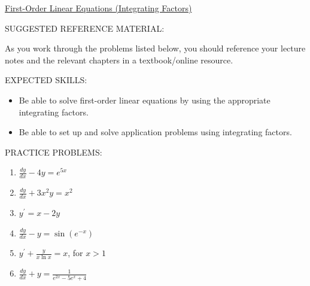 \documentclass[12pt]{article}
\newif\ifans
\begin{document}
\begin{center}
\underline{\LARGE{First-Order Linear Equations (Integrating Factors)}}
\end{center}

\noindent SUGGESTED REFERENCE MATERIAL:

\medskip

\noindent As you work through the problems listed below, you should reference your lecture 
notes and the relevant chapters in a textbook/online resource.

\bigskip

\noindent EXPECTED SKILLS:

\medskip

\begin{itemize}[topsep=0pt]

\item Be able to solve first-order linear equations by using the appropriate integrating factors.

\item Be able to set up and solve application problems using integrating factors. 

\end{itemize}

\bigskip

\noindent PRACTICE PROBLEMS:

\medskip


\medskip

\begin{enumerate}
\setcounter{enumi}{0}

\item $\frac{dy}{dx}-4y=e^{5x}$

\ifans{\fbox{$y=e^{5x}+Ce^{4x}$}} \fi

\item $\frac{dy}{dx}+3x^2y=x^2$

\ifans{\fbox{$\frac{1}{3}+Ce^{-x^3}$}} \fi

\item $y^{\prime}=x-2y$

\ifans{\fbox{$Ce^{-2x}+\frac{1}{2}x-\frac{1}{4}$}} \fi

\item $\frac{dy}{dx}-y=\sin{(e^{-x})}$

\ifans{\fbox{$y=e^x\cos{(e^{-x})}+Ce^x$}} \fi

\item $y^{\prime}+\frac{y}{x\ln{x}}=x$, for $x>1$

\ifans{\fbox{$y=\frac{1}{2}x^2-\frac{x^2}{4\ln{x}}+\frac{C}{\ln{x}}$}} \fi

\item $\frac{dy}{dx}+y=\frac{1}{e^{2x}-5e^x+4}$

\ifans{\fbox{$y=\frac{1}{3}e^{-x}\ln{\left|\frac{e^x-4}{e^x-1}\right|+Ce^{-x}}$; Detailed Solution: \textcolor{blue}{\href{http://www.math.drexel.edu/classes/Calculus/resources/Math123HW/Solutions/123_03_Integrating_Factors_06.pdf}{Here}}}} \fi


\end{enumerate}
\end{document}
